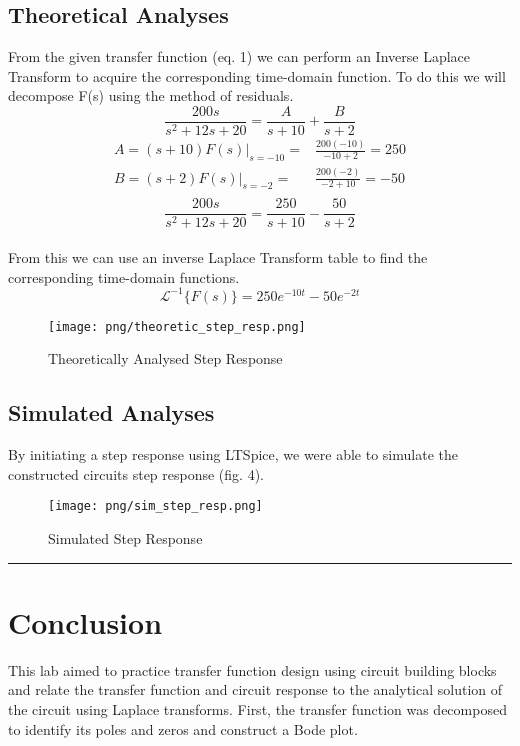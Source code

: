 \documentclass[16pt]{article}
\begin{document}
\subsection*{\textcolor{mycolor}{Theoretical Analyses}}
From the given transfer function (eq. 1) we can perform an Inverse Laplace Transform to acquire the corresponding time-domain function. To do this we will decompose F(s) using the method of residuals.
\begin{equation*}
    \frac{200s}{s^2+12s+20} = \frac{A}{s+10} + \frac{B}{s+2}
\end{equation*}
\begin{align*}
    A=(s+10)F(s)|_{s=-10}=& \frac{200(-10)}{-10+2} = 250\\
    B=(s+2)F(s)|_{s=-2}=& \frac{200(-2)}{-2+10} = -50\\
\end{align*}
\begin{equation*}
    \frac{200s}{s^2+12s+20} = \frac{250}{s+10} - \frac{50}{s+2}
\end{equation*}
\\
From this we can use an inverse Laplace Transform table to find the corresponding time-domain functions.
\begin{equation*}
    \mathcal{L}^{-1}\{F(s)\}=250e^{-10t}-50e^{-2t}
\end{equation*}

\begin{figure}[H]
    \centering
    \texttt{[image: png/theoretic\_step\_resp.png]}
    \caption{Theoretically Analysed Step Response}
    \label{fig:Theoretically Analysed Step Response}
\end{figure}

\subsection*{\textcolor{mycolor}{Simulated Analyses}}
By initiating a step response using LTSpice, we were able to simulate the constructed circuits step response (fig. 4). 
\begin{figure}[H]
    \centering
    \texttt{[image: png/sim\_step\_resp.png]}
    \caption{Simulated Step Response}
    \label{fig:Simulated Step Response}
\end{figure}
\vspace{5mm}
\hrule

\section*{\textcolor{mycolor}{Conclusion}}
This lab aimed to practice transfer function design using circuit building blocks and relate the transfer function and circuit response to the analytical solution of the circuit using Laplace transforms. First, the transfer function was decomposed to identify its poles and zeros and construct a Bode plot. 
\end{document}
